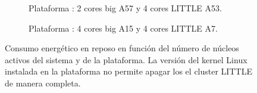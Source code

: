 \begin{figure}
  \centering
  \begin{subfigure}{0.9\textwidth}
    \centering
    \caption{Plataforma \juno: 2 cores big A57 y 4 cores LITTLE A53.}
      \label{}
    \end{subfigure}
\vspace{0.5cm}

    \begin{subfigure}{0.9\textwidth}
      \centering
      \setlength{\fboxsep}{20pt} %
      \caption{Plataforma \odroid: 4 cores big A15 y 4 cores LITTLE A7.}
      \label{}
    \end{subfigure}  
    
  \caption[Consumo energético en función del número de cores activos en
  cada cluster]{Consumo energético en reposo en función del número de núcleos
    activos del sistema y de la plataforma. La versión del kernel Linux
    instalada en la plataforma \odroid no permite apagar los el cluster
    LITTLE de manera completa.}
  \label{s5:fig:apagadoCores}
\end{figure}


